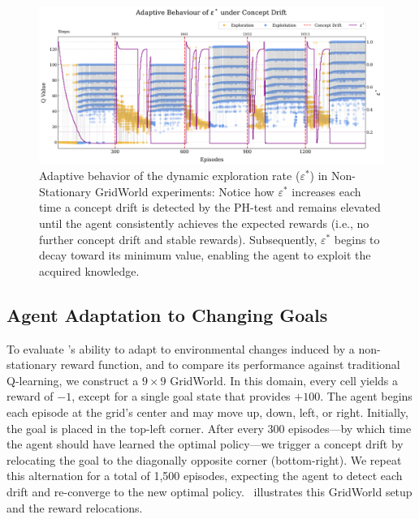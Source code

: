 \begin{figure}
    \centering
    \includegraphics[width=\textwidth]{figures/eps}
    \caption{Adaptive behavior of the dynamic exploration rate ($\varepsilon^*$) in Non-Stationary GridWorld experiments: Notice how $\varepsilon^*$ increases each time a concept drift is detected by the PH-test and remains elevated until the agent consistently achieves the expected rewards (i.e., no further concept drift and stable rewards). Subsequently, $\varepsilon^*$ begins to decay toward its minimum value, enabling the agent to exploit the acquired knowledge.}
    \label{fig:dynamic-eps}
\end{figure}

\subsection{Agent Adaptation to Changing Goals}
\label{sec:experiments}

To evaluate \adaptiverl's ability to adapt to environmental changes induced by a non-stationary reward function, and to compare its performance against traditional Q-learning, we construct a $9\times 9$ GridWorld. In this domain, every cell yields a reward of $-1$, except for a single goal state that provides $+100$. The agent begins each episode at the grid's center and may move up, down, left, or right. Initially, the goal is placed in the top-left corner. After every 300 episodes---by which time the agent should have learned the optimal policy---we trigger a concept drift by relocating the goal to the diagonally opposite corner (bottom-right). We repeat this alternation for a total of 1,500 episodes, expecting the agent to detect each drift and re-converge to the new optimal policy.~ illustrates this GridWorld setup and the reward relocations.

